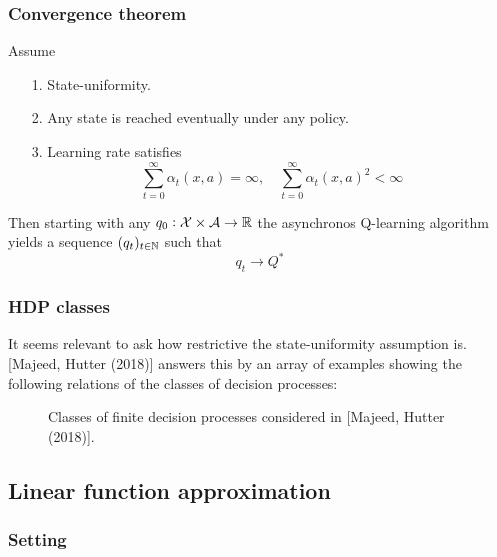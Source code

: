 \documentclass{beamer}[10]
\begin{document}
\begin{frame}
  \frametitle{Convergence theorem}
  \begin{thm}
    Assume
    \begin{itemize}
      \item[1.] State-uniformity.
      \item[2.] Any state is reached eventually under any policy.
      \item[3.] Learning rate satisfies
	\[ \sum_{t=0}^\infty \alpha_t(x, a) = \infty, \quad
	\sum_{t=0}^\infty \alpha_t(x, a)^2 < \infty \]
    \end{itemize}
    Then starting with any $q_0 : \mathcal{X} \times \mathcal{A} \to \mathbb{R}$
    the asynchronos Q-learning algorithm yields a sequence
    $(q_t)_{t \in \mathbb{N}}$ such that
    \[q_t \to Q^* \] 
  \end{thm}
\end{frame}

\begin{frame}
  \frametitle{HDP classes}
  \begin{footnotesize}
  It seems relevant to ask how restrictive the state-uniformity assumption is.
  [Majeed, Hutter (2018)]
  answers this by an array of examples showing the following
  relations of the classes of decision processes:
  \begin{figure}[H]
    \centering
    \caption{Classes of finite decision processes considered in
      [Majeed, Hutter (2018)].
    }
  \end{figure}
\end{footnotesize}
\end{frame}

\subsection{Linear function approximation}

\begin{frame}
  \frametitle{Setting}

\end{frame}
\end{document}
